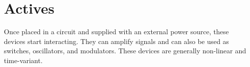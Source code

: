 \section{Actives}

Once placed in a circuit and supplied with an external power source,
these devices start interacting. They can amplify signals and can
also be used as switches, oscillators, and modulators. These devices
are generally non-linear and time-variant.


